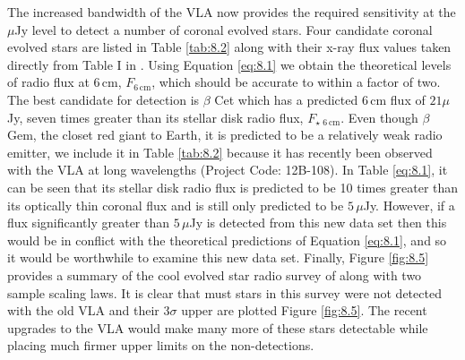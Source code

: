 The increased bandwidth of the VLA now provides the required sensitivity at the $\mu$Jy level to detect a number of coronal evolved stars. Four candidate coronal evolved stars are listed in Table \ref{tab:8.2} along with their x-ray flux values taken directly from Table I in \cite{drake_1986}. Using Equation \ref{eq:8.1} we obtain the theoretical levels of radio flux at 6\,cm, $F_{6\,\mathrm{cm}}$,  which should be accurate to within a factor of two. The best candidate for detection is $\beta$ Cet which has a predicted 6\,cm flux of $21\mu$Jy, seven times greater than its stellar disk radio flux, $F_{\star \,\,6\,\mathrm{cm}}$. Even though $\beta$ Gem, the closet red giant to Earth, it is predicted to be a relatively weak radio emitter, we include it in Table \ref{tab:8.2} because it has recently been observed with the VLA at long wavelengths (Project Code: 12B-108). In Table \ref{eq:8.1}, it can be seen that its stellar disk radio flux is predicted to be 10 times greater than its optically thin coronal flux and is still only predicted to be $5\,\mu$Jy. However, if a flux significantly greater than $5\,\mu$Jy is detected from this new data set then this would be in conflict with the theoretical predictions of Equation \ref{eq:8.1}, and so it would be worthwhile to examine this new data set. Finally, Figure \ref{fig:8.5} provides a summary of the cool evolved star radio survey of \cite{drake_1986} along with two sample scaling laws. It is clear that must stars in this survey were not detected with the old VLA and their $3\sigma$ upper are plotted Figure \ref{fig:8.5}. The recent upgrades to the VLA would make many more of these stars detectable while placing much firmer upper limits on the non-detections. 


